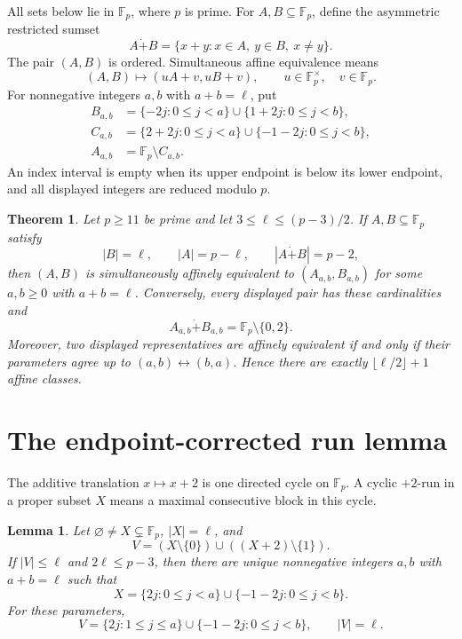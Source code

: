 \documentclass[11pt]{article}
\newtheorem{theorem}{Theorem}
\newtheorem{lemma}{Lemma}
\newcommand{\Fp}{\mathbb F_p}
\newcommand{\rsum}{\mathbin{\dot{+}}}
\begin{document}
All sets below lie in $\Fp$, where $p$ is prime.  For $A,B\subseteq\Fp$,
define the asymmetric restricted sumset
\[
 A\rsum B=\{x+y:x\in A,\ y\in B,\ x\ne y\}.
\]
The pair $(A,B)$ is ordered.  Simultaneous affine equivalence means
\[
 (A,B)\longmapsto (uA+v,uB+v),\qquad u\in\Fp^\times,\quad v\in\Fp.
\]
For nonnegative integers $a,b$ with $a+b=\ell$, put
\begin{align*}
 B_{a,b}&=\{-2j:0\leq j<a\}\cup\{1+2j:0\leq j<b\},\\
 C_{a,b}&=\{2+2j:0\leq j<a\}\cup\{-1-2j:0\leq j<b\},\\
 A_{a,b}&=\Fp\setminus C_{a,b}.
\end{align*}
An index interval is empty when its upper endpoint is below its lower
endpoint, and all displayed integers are reduced modulo $p$.

\begin{theorem}\label{thm:classification}
Let $p\geq11$ be prime and let $3\leq\ell\leq(p-3)/2$.  If
$A,B\subseteq\Fp$ satisfy
\[
 |B|=\ell,\qquad |A|=p-\ell,\qquad |A\rsum B|=p-2,
\]
then $(A,B)$ is simultaneously affinely equivalent to
$(A_{a,b},B_{a,b})$ for some $a,b\geq0$ with $a+b=\ell$.  Conversely,
every displayed pair has these cardinalities and
\[
 A_{a,b}\rsum B_{a,b}=\Fp\setminus\{0,2\}.
\]
Moreover, two displayed representatives are affinely equivalent if and only
if their parameters agree up to $(a,b)\leftrightarrow(b,a)$.  Hence there
are exactly $\lfloor\ell/2\rfloor+1$ affine classes.
\end{theorem}

\section{The endpoint-corrected run lemma}

The additive translation $x\mapsto x+2$ is one directed cycle on $\Fp$.
A cyclic $+2$-run in a proper subset $X$ means a maximal consecutive block
in this cycle.

\begin{lemma}\label{lem:runs}
Let $\varnothing\ne X\subsetneq\Fp$, $|X|=\ell$, and
\[
 V=(X\setminus\{0\})\cup((X+2)\setminus\{1\}).
\]
If $|V|\leq\ell$ and $2\ell\leq p-3$, then there are unique nonnegative
integers $a,b$ with $a+b=\ell$ such that
\begin{equation}\label{eq:Xform}
 X=\{2j:0\leq j<a\}\cup\{-1-2j:0\leq j<b\}.
\end{equation}
For these parameters,
\begin{equation}\label{eq:Vform}
 V=\{2j:1\leq j\leq a\}\cup\{-1-2j:0\leq j<b\},
 \qquad |V|=\ell.
\end{equation}
\end{lemma}
\end{document}
